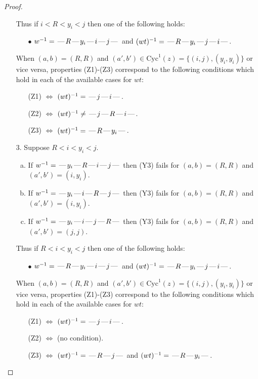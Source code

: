 \documentclass[10pt]{article}
\theoremstyle{definition}
\theoremstyle{definition}
\def\dash{\text{\hspace{0.5mm}---\hspace{0.5mm}}}
\def\Cyc{\mathrm{Cyc}}
\begin{document}
\begin{proof}
\begin{enumerate}
Thus if $i < R < y_i < j$ then one of the following holds:
\begin{enumerate}
\item[$\bullet$] $w^{-1} = \dash R\dash y_i\dash i\dash j\dash $ and $(wt)^{-1} = \dash R\dash y_i\dash j\dash i\dash $.
\end{enumerate}
When $(a,b)= (R,R)$ and $(a',b')\in \Cyc^1(z)=\{(i,j),(y_i,y_i)\}$ or vice versa,
properties (Z1)-(Z3) correspond to the following conditions which
hold in each of the available cases for $wt$:
\begin{enumerate}
\item[](Z1) $\Leftrightarrow$ $(wt)^{-1} = \dash j \dash i \dash$.
\item[](Z2) $\Leftrightarrow$ $(wt)^{-1} \neq \dash j \dash R \dash i \dash$.
\item[](Z3) $\Leftrightarrow$ $(wt)^{-1} = \dash R \dash y_i \dash$.
\end{enumerate}
\item[$3$.] Suppose $R < i < y_i < j$.
\begin{enumerate}[(a)]
\item If $w^{-1} = \dash y_i\dash R\dash i\dash j\dash $ then (Y3) fails for $(a,b)=(R,R)$ and $(a',b')=(i,y_i)$.
\item If $w^{-1} = \dash y_i\dash i\dash R\dash j\dash $ then (Y3) fails for $(a,b)=(R,R)$ and $(a',b')=(i,y_i)$.
\item If $w^{-1} = \dash y_i\dash i\dash j\dash R\dash $ then (Y3) fails for $(a,b)=(R,R)$ and $(a',b')=(j,j)$.
\end{enumerate}
Thus if $R < i < y_i < j$ then one of the following holds:
\begin{enumerate}
\item[$\bullet$] $w^{-1} = \dash R\dash y_i\dash i\dash j\dash $ and $(wt)^{-1} = \dash R\dash y_i\dash j\dash i\dash $.
\end{enumerate}
When $(a,b)= (R,R)$ and $(a',b')\in \Cyc^1(z)=\{(i,j),(y_i,y_i)\}$ or vice versa,
properties (Z1)-(Z3) correspond to the following conditions which
hold in each of the available cases for $wt$:
\begin{enumerate}
\item[](Z1) $\Leftrightarrow$ $(wt)^{-1} = \dash j \dash i \dash$.
\item[](Z2) $\Leftrightarrow$ (no condition).
\item[](Z3) $\Leftrightarrow$ $(wt)^{-1} = \dash R \dash j \dash$  and $(wt)^{-1} = \dash R \dash y_i \dash$.
\end{enumerate}

\end{enumerate}
\end{proof}
\end{document}
